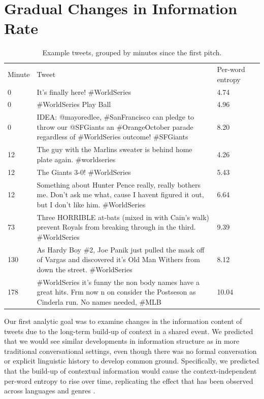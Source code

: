 \documentclass[11pt,letterpaper]{article}
\begin{document}
\section{Gradual Changes in Information Rate}
\begin{table}[!htb]
  \begin{tabular}{M{.4in}L{4.5in}M{1.1in}M{.01in}}
 Minute & Tweet & Per-word entropy& \\
0 & It's finally here! \#WorldSeries & 4.74&\\[6pt]
0 & \#WorldSeries Play Ball & 4.96 & \\[6pt]
0 & \parbox[][6ex][c]{.7\textwidth}{IDEA: @mayoredlee, \#SanFrancisco can pledge to throw our @SFGiants an \#OrangeOctober parade regardless of \#WorldSeries outcome! \#SFGiants} & 8.20&\\[20pt]
12 & The guy with the Marlins sweater is behind home plate again. \#worldseries & 4.26&\\[6pt]
12 & The Giants 3-0! \#WorldSeries & 5.43&\\[6pt]
12 & \parbox[][6ex][c]{.7\textwidth}{Something about Hunter Pence really, really bothers me. Don't ask me what, cause I havent figured it out, but I don't like him. \#WorldSeries} & 6.64&\\[20pt]
73 & \parbox[][6ex][c]{.7\textwidth}{Three HORRIBLE at-bats (mixed in with Cain's walk) prevent Royals from breaking through in the third. \#WorldSeries} & 9.39&\\[20pt]
130 & \parbox[][6ex][c]{.7\textwidth}{As Hardy Boy \#2, Joe Panik just pulled the mask off of Vargas and discovered it's Old Man Withers from down the street. \#WorldSeries} & 8.12&\\[20pt]
178 & \parbox[][6ex][c]{.7\textwidth}{\#WorldSeries it's funny the non body names have a great hits. Frm now n on consider the Postseson as Cinderla run.  No names needed, \#MLB} & 10.04&\\[20pt]
  \end{tabular}
 \caption{Example tweets, grouped by minutes since the first pitch.}\label{tab:ex}
\end{table}

Our first analytic goal was to examine changes in the information content of tweets due to the long-term build-up of context in a shared event.  We predicted that we would see similar developments in information structure as in more traditional conversational settings, even though there was no formal conversation or explicit linguistic history to develop common ground.  Specifically, we predicted that the build-up of contextual information would cause the context-independent per-word entropy to rise over time, replicating the effect that has been observed across languages and genres \cite{genzel2003,qian2012}.
\end{document}
